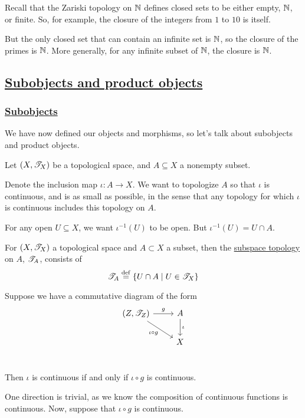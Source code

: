 \documentclass[x11names,reqno,14pt]{extarticle}
\begin{document}
Recall that the Zariski topology on $\mathbb{N}$ defines closed sets to be either empty, $\mathbb{N}$, or finite. So, for example, the closure of the integers from $1$ to $10$ is itself. 

But the only closed set that can contain an infinite set is $\mathbb{N}$, so the closure of the primes is $\mathbb{N}$. More generally, for any infinite subset of $\mathbb{N}$, the closure is $\mathbb{N}$. 

\subsection*{\underline{Subobjects and product objects}}

\subsubsection*{\underline{Subobjects}}

We have now defined our objects and morphisms, so let's talk about subobjects and product objects. 

Let $(X, \mathscr{T}_X)$ be a topological space, and $A\subseteq X$ a nonempty subset. 

Denote the inclusion map $\iota:A\to X$. We want to topologize $A$ so that $\iota$ is continuous, and is as small as possible, in the sense that any topology for which $\iota$ is continuous includes this topology on $A$. 

For any open $U\subseteq X$, we want $\iota^{-1}(U)$ to be open. But $\iota^{-1}(U) = U \cap A$. 


For $(X, \mathscr{T}_X)$ a topological space and $A\subset X$ a subset, then the \underline{subspace topology} on $A$, $\mathscr{T}_A$, consists of 
\[
\mathscr{T}_A \overset{\mathrm{def}}{=} \{U \cap A \mid U \in \mathscr{T}_X\}
\]

\prop

Suppose we have a commutative diagram of the form 
\[
\begin{tikzcd}
(Z, \ms{T}_Z) \arrow[rd, "\iota \circ g"'] \arrow[r, "g"] & A \arrow[d, "\iota"] \\
& X \\
\end{tikzcd}
\]

Then $\iota$ is continuous if and only if $\iota \circ g$ is continuous. 

\proof

One direction is trivial, as we know the composition of continuous functions is continuous. Now, suppose that $\iota \circ g$ is continuous. 
\end{document}
